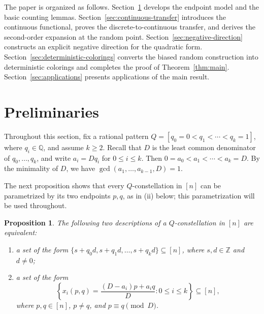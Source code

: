 \documentclass[twoside,12pt]{article}
\newcommand{\Q}{\mathbb{Q}}
\newcommand{\Z}{\mathbb{Z}}
\newcommand{\1}{\mathbf 1}
\newtheorem{proposition}{Proposition}[section]
\begin{document}
The paper is organized as follows.  Section~\ref{sec:preliminaries} develops
the endpoint model and the basic counting lemmas.  Section~\ref{sec:continuous-transfer}
introduces the continuous functional, proves the discrete-to-continuous
transfer, and derives the second-order expansion at the random point.
Section~\ref{sec:negative-direction} constructs an explicit negative direction
for the quadratic form.  Section~\ref{sec:deterministic-colorings} converts the
biased random construction into deterministic colorings and completes the proof
of Theorem~\ref{thm:main}.  Section~\ref{sec:applications} presents
applications of the main result.

\section{Preliminaries}\label{sec:preliminaries}

Throughout this section, fix a rational pattern
\(Q=[q_0=0<q_1<\cdots<q_k=1]\), where \(q_i\in\Q\), and assume \(k\ge2\).
Recall that \(D\) is the least common denominator of \(q_0,\dots,q_k\), and
write \(a_i=Dq_i\) for \(0\le i\le k\).  Then
\(0=a_0<a_1<\cdots<a_k=D\).  By the minimality of \(D\), we have
\(\gcd(a_1,\dots,a_{k-1},D)=1\).

The next proposition shows that every \(Q\)-constellation in \([n]\) can be
parametrized by its two endpoints \(p,q\), as in \textnormal{(ii)} below; this
parametrization will be used throughout.

\begin{proposition}\label{pro-1}
The following two descriptions of a \(Q\)-constellation in \([n]\) are
equivalent:
\begin{enumerate}[label=\textnormal{(\roman*)}]
\item a set of the form
\(\{s+q_0d,s+q_1d,\dots,s+q_kd\}\subseteq[n]\), where
\(s,d\in\Z\) and \(d\ne0\);
\item a set of the form
\begin{equation}\label{eq-xpq}
\left\{
x_i(p,q)=\frac{(D-a_i)p+a_iq}{D}:0\le i\le k
\right\}\subseteq[n],
\end{equation}
where \(p,q\in[n]\), \(p\ne q\), and \(p\equiv q\pmod D\).
\end{enumerate}
\end{proposition}
\end{document}
